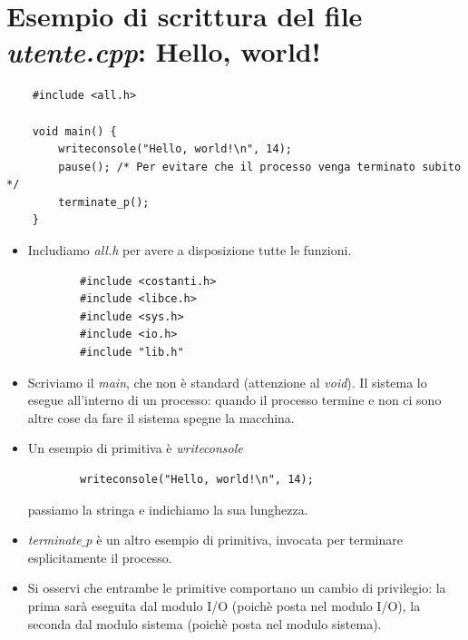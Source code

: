 \section{Esempio di scrittura del file \emph{utente.cpp}:  Hello, world!}
\small
\begin{verbatim}
	#include <all.h>
	
	void main() {
		writeconsole("Hello, world!\n", 14);
		pause(); /* Per evitare che il processo venga terminato subito */
		terminate_p();
	}
\end{verbatim}
\normalsize
\begin{itemize}
	\item Includiamo \emph{all.h} per avere a disposizione tutte le funzioni.
	\begin{verbatim}
		#include <costanti.h>
		#include <libce.h>
		#include <sys.h>
		#include <io.h>
		#include "lib.h"
	\end{verbatim}
	\item Scriviamo il \emph{main}, che non è standard (attenzione al \emph{void}). Il sistema lo esegue all'interno di un processo: quando il processo termine e non ci sono altre cose da fare il sistema spegne la macchina.
	\item Un esempio di primitiva è \emph{writeconsole}
	\begin{verbatim}
		writeconsole("Hello, world!\n", 14);
	\end{verbatim}
	passiamo la stringa e indichiamo la sua lunghezza.
	\item \emph{terminate$\_$p} è un altro esempio di primitiva, invocata per terminare esplicitamente il processo.
	\item Si osservi che entrambe le primitive comportano un cambio di privilegio: la prima sarà eseguita dal modulo I/O (poichè posta nel modulo I/O), la seconda dal modulo sistema (poichè posta nel modulo sistema).
\end{itemize}
